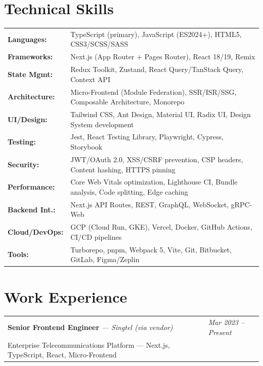 \documentclass[a4paper,11pt]{article}
\newcommand{\resumeSubheading}[4]{
  \vspace{-1pt}\noindent
  \begin{tabularx}{\textwidth}{X >{\raggedleft\arraybackslash}p{4.2cm}}
    \textbf{#1} \textit{\small --- #2} & \textit{\small #3} \\
    \small #4 & \\
  \end{tabularx}\vspace{-6pt}
}
\begin{document}
\section{Technical Skills}
\begin{tabularx}{\textwidth}{@{}l X@{}}
  \textbf{Languages:} & TypeScript (primary), JavaScript (ES2024+), HTML5, CSS3/SCSS/SASS \\
  \textbf{Frameworks:} & Next.js (App Router + Pages Router), React 18/19, Remix \\
  \textbf{State Mgmt:} & Redux Toolkit, Zustand, React Query/TanStack Query, Context API \\
  \textbf{Architecture:} & Micro-Frontend (Module Federation), SSR/ISR/SSG, Composable Architecture, Monorepo \\
  \textbf{UI/Design:} & Tailwind CSS, Ant Design, Material UI, Radix UI, Design System development \\
  \textbf{Testing:} & Jest, React Testing Library, Playwright, Cypress, Storybook \\
  \textbf{Security:} & JWT/OAuth 2.0, XSS/CSRF prevention, CSP headers, Content hashing, HTTPS pinning \\
  \textbf{Performance:} & Core Web Vitals optimization, Lighthouse CI, Bundle analysis, Code splitting, Edge caching \\
  \textbf{Backend Int.:} & Next.js API Routes, REST, GraphQL, WebSocket, gRPC-Web \\
  \textbf{Cloud/DevOps:} & GCP (Cloud Run, GKE), Vercel, Docker, GitHub Actions, CI/CD pipelines \\
  \textbf{Tools:} & Turborepo, pnpm, Webpack 5, Vite, Git, Bitbucket, GitLab, Figma/Zeplin \\
\end{tabularx}

\section{Work Experience}

\resumeSubheading
  {Senior Frontend Engineer}{Singtel (via vendor)}{Mar 2023 -- Present}
  {Enterprise Telecommunications Platform --- Next.js, TypeScript, React, Micro-Frontend}
\end{document}
